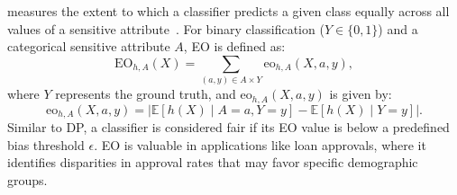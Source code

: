  measures the extent to which a classifier predicts a given class equally across all values of a sensitive attribute~\cite{placeholder}.
%
For binary classification (\( Y \in \{0, 1\} \)) and a categorical sensitive attribute \( A \), \gls{EO} is defined as:
%
\begin{equation}
\text{EO}_{h,A}(X) = \sum_{(a, y) \in A \times Y} \text{eo}_{h,A}(X, a, y),
\end{equation}
%
where \( Y \) represents the ground truth, and \( \text{eo}_{h,A}(X, a, y) \) is given by:
%
\begin{equation}
\text{eo}_{h,A}(X, a, y) = \left| \mathbb{E}[h(X) \mid A = a, Y = y] - \mathbb{E}[h(X) \mid Y = y] \right|.
\end{equation}
%
Similar to \gls{DP}, a classifier is considered fair if its \gls{EO} value is below a predefined bias threshold \( \epsilon \).
%
\Gls{EO} is valuable in applications like loan approvals, where it identifies disparities in approval rates that may favor specific demographic groups.



\section[Fairness under constraints injection]{}\label{sec:fauci}




